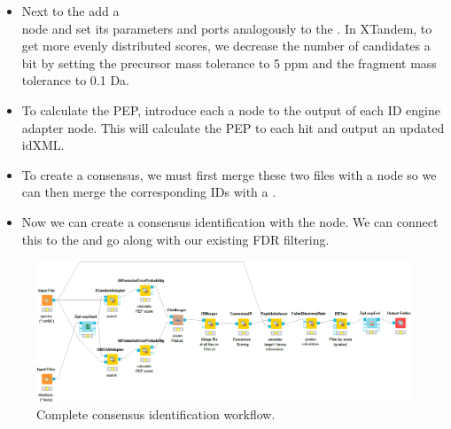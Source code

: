 \begin{itemize}
\item
Next to the  add a  \\
 node and set its parameters and ports analogously to the . In XTandem, to get more evenly distributed scores, we decrease the number of candidates a bit by setting the precursor mass tolerance to 5 ppm and the fragment mass tolerance to 0.1 Da.
\item
To calculate the PEP, introduce each a   node to the output of each ID engine adapter node.
This will calculate the PEP to each hit and output an updated idXML.
\item
To create a consensus, we must first merge these two files with a  node  so we can then merge the corresponding IDs with a  .
\item
Now we can create a consensus identification with the   node.
We can connect this to the  and go along with our existing FDR filtering.
\end{itemize}

\begin{figure}[htbp]
  \centering
  \includegraphics[width=\textwidth]{graphics/labelfree/PepConsensusId.png}
  \caption{Complete consensus identification workflow.}
  \label{fig:consensusid}
\end{figure}

